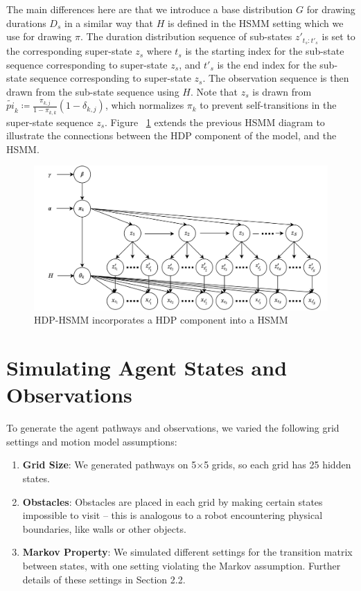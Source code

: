 \documentclass{article}
\begin{document}
The main differences here are that we introduce a base distribution $G$ for drawing durations $D_s$ in a similar way that $H$ is defined in the HSMM setting which we use for drawing $\pi$. The duration distribution sequence of sub-states $z'_{t_{s}:t'_{s}}$ is set to the corresponding super-state $z_{s}$ where $t_{s}$ is the starting index for the sub-state sequence corresponding to super-state $z_s$, and $t'_{s}$ is the end index for the sub-state sequence corresponding to super-state $z_s$. The observation sequence is then drawn from the sub-state sequence using $H$. Note that $z_s$ is drawn from $\tilde{pi}_{k} \coloneqq \frac{\pi_{k,j}}{1-\pi_{k,k}}(1 - \delta_{k,j})$, which normalizes $\pi_k$ to prevent self-transitions in the super-state sequence $z_s$. Figure ~\ref{fig:hdphsmm} extends the previous HSMM diagram to illustrate the connections between the HDP component of the model, and the HSMM.

\begin{figure}[H]
\centering
\includegraphics[scale=0.10]{images/hdphsmm.png}
\caption{HDP-HSMM incorporates a HDP component into a HSMM}
\label{fig:hdphsmm}
\end{figure}

\section{Simulating Agent States and Observations}

To generate the agent pathways and observations, we varied the following grid settings and motion model assumptions:

\begin{enumerate}
	\item \textbf{Grid Size}: We generated pathways on 5$\times$5 grids, so each grid has 25 hidden states.
	\item \textbf{Obstacles}: Obstacles are placed in each grid by making certain states impossible to visit -- this is analogous to a robot encountering physical boundaries, like walls or other objects.
	\item \textbf{Markov Property}: We simulated different settings for the transition matrix between states, with one setting violating the Markov assumption. Further details of these settings in Section 2.2.
\end{enumerate}
\end{document}
